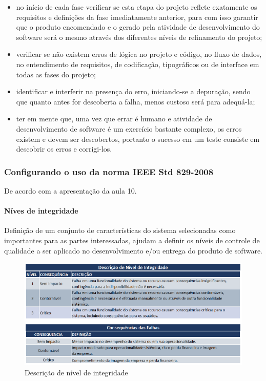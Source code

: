 \begin{itemize}
\item no início de cada fase verificar se esta etapa do projeto reflete exatamente os requisitos e definições da fase imediatamente anterior, para com isso garantir que o produto encomendado e o gerado pela atividade de desenvolvimento do software será o mesmo através dos diferentes níveis de refinamento do projeto;
\item verificar se não existem erros de lógica no projeto e código, no fluxo de dados, no entendimento de requisitos, de codificação, tipográficos ou de interface em todas as fases do projeto;
\item identificar e interferir na presença do erro, iniciando-se a depuração, sendo que quanto antes for descoberta a falha, menos custoso será para adequá-la;
\item ter em mente que, uma vez que errar é humano e atividade de desenvolvimento de software é um exercício bastante complexo, os erros existem e devem ser descobertos, portanto o sucesso em um teste consiste em descobrir os erros e corrigi-los.
\end{itemize}

\subsubsection{Configurando o uso da norma IEEE Std 829-2008 \cite{IEEE829}}

De acordo com a apresentação da aula 10.

\paragraph{Níves de integridade}

Definição de um conjunto de características do sistema selecionadas como importantes para as partes interessadas, ajudam a definir os níveis de controle de qualidade a ser aplicado no desenvolvimento e/ou entrega do produto de software.

\begin{figure}[H]
  \centering
  \includegraphics[width=1\textwidth]{softwareengineer/images/integrity-level} 
  \caption{Descrição de nível de integridade}
  \label{fig:integrity} 
\end{figure}

